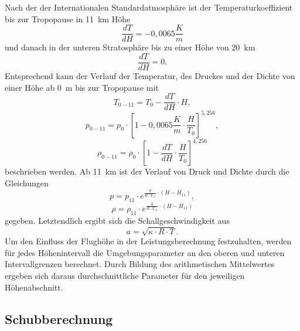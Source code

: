 Nach der der Internationalen Standardatmosphäre ist der Temperaturkoeffizient bis zur Tropopause in \SI{11}{km} Höhe
\begin{equation}
	\frac{dT}{dH} = -0,0065\frac{K}{m}
\end{equation}
und danach in der unteren Stratosphäre bis zu einer Höhe von \SI{20}{km}
\begin{equation}
	\frac{dT}{dH} = 0.
\end{equation}
Entsprechend kann der Verlauf der Temperatur, des Druckes und der Dichte von einer Höhe ab \SI{0}{m} bis zur Tropopause mit
\begin{equation}
	T_{0-11} = T_0 - \frac{dT}{dH}\cdot H,
\end{equation}
\begin{equation}
	p_{0-11} = p_0\cdot [1-0,0065\frac{K}{m}\cdot \frac{H}{T_0}]^{5,256},
\end{equation}
\begin{equation}
	\rho_{0-11} = \rho_0 \cdot [1-\frac{dT}{dH}\cdot \frac{H}{T_0}]^{4,256}
\end{equation}
beschrieben werden. Ab \SI{11}{km} ist der Verlauf von Druck und Dichte durch die Gleichungen
\begin{equation}
	p = p_{11}\cdot e^{\frac{g}{R\cdot T_{11}}\cdot (H-H_{11})},
	\label{eq:druck_strato}
\end{equation} 
\begin{equation}
	\rho = \rho_{11}\cdot e^{\frac{g}{R\cdot T_{11}}\cdot (H-H_{11})}
	\label{eq:dichte_strato}
\end{equation}
gegeben.
Letztendlich ergibt sich die Schallgeschwindigkeit aus 
\begin{equation}
	a = \sqrt{\kappa\cdot R\cdot T}.
\end{equation}
Um den Einfluss der Flughöhe in der Leistungsberechnung festzuhalten, werden für jedes Höhenintervall die Umgebungsparameter an den oberen und unteren Intervallgrenzen berechnet. Durch Bildung des arithmetischen Mittelwertes ergeben sich daraus durchschnittliche Parameter für den jeweiligen Höhenabschnitt.  

\subsection{Schubberechnung}

